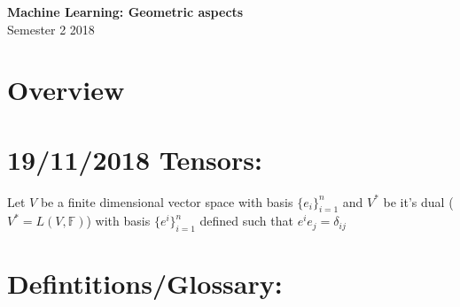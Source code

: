 \documentclass[12pt]{article}
\newcommand{\kd}[2]{\delta_{#1#2}}
\begin{document}
	\begin{center}
		\Large\textbf{Machine Learning: Geometric aspects}\\
		Semester 2 2018
	\end{center}

	\section*{Overview}

	\section*{19/11/2018 Tensors:}
	Let $V$ be a finite dimensional vector space with basis $\{e_i\}_{i=1}^n$ and $V^*$ be it's dual ($V^* = L(V,\mathbb{F})$) with basis $\{e^i\}_{i=1}^n$ defined such that $e^ie_j = \kd{i}{j}$

	\section*{Defintitions/Glossary:}
\end{document}
